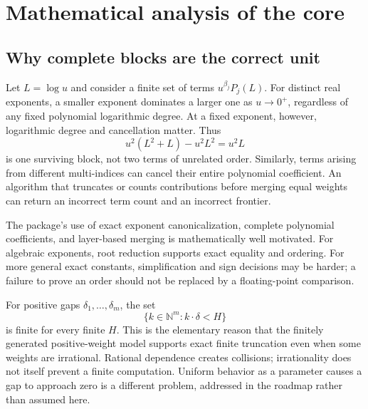\documentclass[11pt,a4paper]{article}
\newcommand{\N}{\mathbb N}
\theoremstyle{remark}\newtheorem{remark}[proposition]{Remark}
\begin{document}


\section{Mathematical analysis of the core}
\subsection{Why complete blocks are the correct unit}
Let $L=\log u$ and consider a finite set of terms $u^{\beta_j}P_j(L)$. For distinct real exponents, a smaller exponent dominates a larger one as $u\to0^+$, regardless of any fixed polynomial logarithmic degree. At a fixed exponent, however, logarithmic degree and cancellation matter. Thus
\[
 u^2(L^2+L)-u^2L^2=u^2L
\]
is one surviving block, not two terms of unrelated order. Similarly, terms arising from different multi-indices can cancel their entire polynomial coefficient. An algorithm that truncates or counts contributions before merging equal weights can return an incorrect term count and an incorrect frontier.

The package's use of exact exponent canonicalization, complete polynomial coefficients, and layer-based merging is mathematically well motivated. For algebraic exponents, root reduction supports exact equality and ordering. For more general exact constants, simplification and sign decisions may be harder; a failure to prove an order should not be replaced by a floating-point comparison.\cite{core,incremental}

For positive gaps $\delta_1,\ldots,\delta_m$, the set
\[
 \{k\in\N^m:k\cdot\delta<H\}
\]
is finite for every finite $H$. This is the elementary reason that the finitely generated positive-weight model supports exact finite truncation even when some weights are irrational. Rational dependence creates collisions; irrationality does not itself prevent a finite computation. Uniform behavior as a parameter causes a gap to approach zero is a different problem, addressed in the roadmap rather than assumed here.
\end{document}
